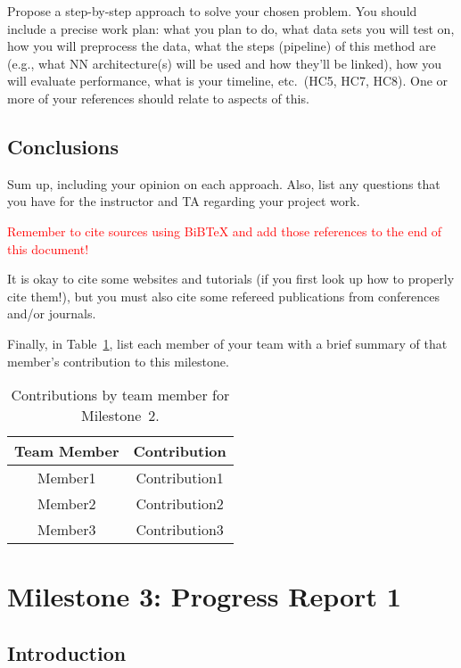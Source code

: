 \documentclass{report}
\begin{document}
Propose a step-by-step approach to solve your chosen problem.  You should include 
a precise work plan: what you plan to do, what data sets you will test on, how you will preprocess the data, what the steps (pipeline) of this method are  (e.g., what NN architecture(s) will be used and how they'll be linked), how you will evaluate performance, what is your timeline, etc.\ (HC5, HC7, HC8).  One or more of your references should relate to aspects of this. 

\section{Conclusions}

Sum up, including your opinion on each approach.  Also, list any questions that you have for the instructor and TA regarding your project work.

\textcolor{red}{Remember to cite sources using BiBTeX and add those references to the end of this document!}

It is okay to cite some websites and tutorials (if you first look up how to properly cite them!), but you must also cite some refereed publications from conferences and/or journals.

Finally, in Table~\ref{tab:contribution2}, list each member of your team with a brief summary of that member's contribution to this milestone.

\begin{table}[]
    \caption{Contributions by team member for Milestone~2.}
    \centering
    \begin{tabular}{|c|c|} \hline
    {\bf Team Member}     &  {\bf Contribution}  \\ \hline
    Member1     &  Contribution1 \\
    Member2     &  Contribution2 \\
    Member3     &  Contribution3 \\ \hline
    \end{tabular}
    \label{tab:contribution2}
\end{table}


\chapter{Milestone 3: Progress Report 1}

\section{Introduction}
\label{sec:M3-intro}
\end{document}
